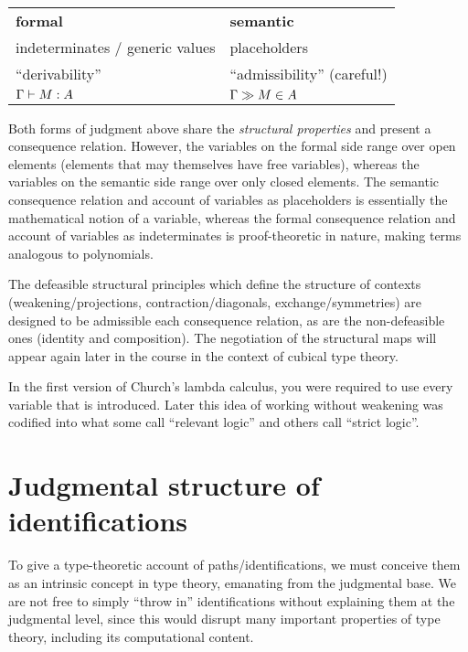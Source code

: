 \documentclass{article}
\begin{document}
\medskip
\begin{center}
  \begin{tabular}{ll}
    \textbf{formal} & \textbf{semantic}
    \\
    indeterminates / generic values & placeholders
    \\
    ``derivability'' & ``admissibility'' (careful!)
    \\
    $\hasEF{\Gamma}{M}{A}$ & $\hasEC{\Gamma}{M}{A}$
  \end{tabular}
\end{center}

Both forms of judgment above share the \emph{structural properties}
and present a consequence relation. However, the variables on the
formal side range over open elements (elements that may themselves
have free variables), whereas the variables on the semantic side range
over only closed elements. The semantic consequence relation and
account of variables as placeholders is essentially the mathematical
notion of a variable, whereas the formal consequence relation and
account of variables as indeterminates is proof-theoretic in nature,
making terms analogous to polynomials.

The defeasible structural principles which define the structure of
contexts (weakening/projections, contraction/diagonals,
exchange/symmetries) are designed to be admissible each consequence
relation, as are the non-defeasible ones (identity and
composition). The negotiation of the structural maps will appear again
later in the course in the context of cubical type theory.

\begin{remark}
  In the first version of Church's lambda calculus, you were required
  to use every variable that is introduced. Later this idea of working
  without weakening was codified into what some call ``relevant
  logic'' and others call ``strict logic''.
\end{remark}



\section{Judgmental structure of identifications}

To give a type-theoretic account of paths/identifications, we must
conceive them as an intrinsic concept in type theory, emanating from
the judgmental base. We are not free to simply ``throw in''
identifications without explaining them at the judgmental level, since
this would disrupt many important properties of type theory, including
its computational content.
\end{document}
